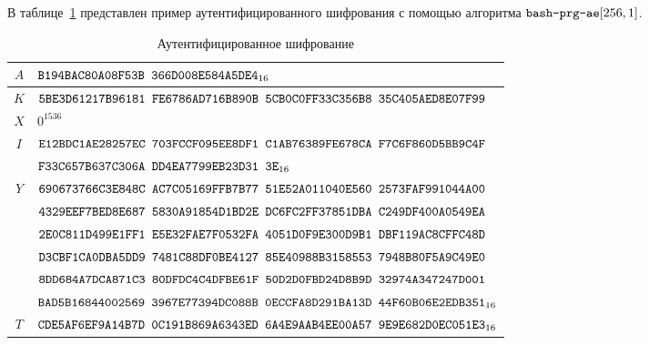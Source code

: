\label{TEST.PrgAE}

В таблице~\ref{Table.TEST.PrgAE} представлен пример аутентифицированного 
шифрования с помощью алгоритма $\texttt{bash-prg-ae}[256,1]$.

\begin{table}[H]
\caption{Аутентифицированное шифрование}\label{Table.TEST.PrgAE}
\begin{tabular}{|c|l|}
\hline
$A$ &
 $\texttt{B194BAC80A08F53B~366D008E584A5DE4}_{16}$\\
\hline
$K$ &
$\texttt{5BE3D61217B96181~FE6786AD716B890B~5CB0C0FF33C356B8~35C405AED8E07F99}$\\
\hline
\hline
$X$ & $0^{1536}$\\
\hline
$I$ &
$\texttt{E12BDC1AE28257EC~703FCCF095EE8DF1~C1AB76389FE678CA~F7C6F860D5BB9C4F}$\\
&
 $\texttt{F33C657B637C306A~DD4EA7799EB23D31~3E}_{16}$\\
\hline
\hline
$Y$ &
$\texttt{690673766C3E848C~AC7C05169FFB7B77~51E52A011040E560~2573FAF991044A00}$\\
&
$\texttt{4329EEF7BED8E687~5830A91854D1BD2E~DC6FC2FF37851DBA~C249DF400A0549EA}$\\
&
$\texttt{2E0C811D499E1FF1~E5E32FAE7F0532FA~4051D0F9E300D9B1~DBF119AC8CFFC48D}$\\
&
$\texttt{D3CBF1CA0DBA5DD9~7481C88DF0BE4127~85E40988B3158553~7948B80F5A9C49E0}$\\
&
$\texttt{8DD684A7DCA871C3~80DFDC4C4DFBE61F~50D2D0FBD24D8B9D~32974A347247D001}$\\
&
 $\texttt{BAD5B16844002569~3967E77394DC088B~0ECCFA8D291BA13D~44F60B06E2EDB351}_{16}$\\
\hline
$T$ &
 $\texttt{CDE5AF6EF9A14B7D~0C191B869A6343ED~6A4E9AAB4EE00A57~9E9E682D0EC051E3}_{16}$\\
\hline
\end{tabular}
\end{table}

